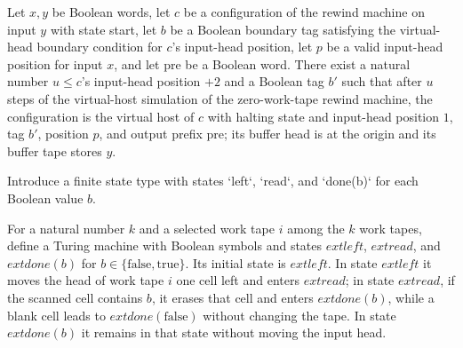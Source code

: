 \begin{theorem}
\label{Complexity.b2b_vhost_rewind}
\leanok
{}
Let $x,y$ be Boolean words, let $c$ be a configuration of the rewind machine on input
$y$ with state start, let $b$ be a Boolean boundary tag satisfying the virtual-head
boundary condition for $c$'s input-head position, let $p$ be a valid input-head position
for input $x$, and let $\mathrm{pre}$ be a Boolean word. There exist a natural number
$u\le c$'s input-head position $+2$ and a Boolean tag $b'$ such that after $u$ steps of
the virtual-host simulation of the zero-work-tape rewind machine, the configuration is
the virtual host of $c$ with halting state and input-head position $1$, tag $b'$,
position $p$, and output prefix $\mathrm{pre}$; its buffer head is at the origin and its
buffer tape stores $y$.
\end{theorem}

\begin{definition}
\label{Complexity.B2bVerdictState}
\leanok
Introduce a finite state type with states `left`, `read`, and `done(b)` for each Boolean
value $b$.
\end{definition}

\begin{definition}
\label{Complexity.b2b_verdictTM}
\leanok
{}
For a natural number $k$ and a selected work tape $i$ among the $k$ work tapes, define a
Turing machine with Boolean symbols and states $	ext{left}$, $	ext{read}$, and
$	ext{done}(b)$ for $b\in\{\mathrm{false},\mathrm{true}\}$. Its initial state is
$	ext{left}$. In state $	ext{left}$ it moves the head of work tape $i$ one cell left and
enters $	ext{read}$; in state $	ext{read}$, if the scanned cell contains $b$, it erases
that cell and enters $	ext{done}(b)$, while a blank cell leads to
$	ext{done}(\mathrm{false})$ without changing the tape. In state $	ext{done}(b)$ it
remains in that state without moving the input head.
\end{definition}

